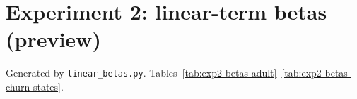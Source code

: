 \documentclass[a4paper,12pt,openany]{book}
\begin{document}
\chapter*{Experiment 2: linear-term betas (preview)}
Generated by \texttt{linear\_betas.py}.
Tables~\ref{tab:exp2-betas-adult}--\ref{tab:exp2-betas-churn-states}.








\end{document}
